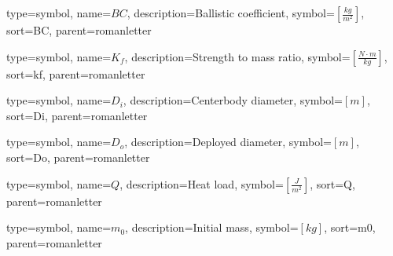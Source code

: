 {
type=symbol, %
name={\ensuremath{BC}}, %
description={Ballistic coefficient}, %
symbol={$\left[\frac{kg}{m^2} \right]$}, %
sort=BC, %
parent=romanletter %
}

{
type=symbol, %
name={\ensuremath{K_f}}, %
description={Strength to mass ratio}, %
symbol={$\left[\frac{N \cdot m}{kg} \right]$}, %
sort=kf, %
parent=romanletter %
}

{
type=symbol, %
name={\ensuremath{D_i}}, %
description={Centerbody diameter}, %
symbol={$\left[m \right]$}, %
sort=Di, %
parent=romanletter %
}

{
type=symbol, %
name={\ensuremath{D_o}}, %
description={Deployed diameter}, %
symbol={$\left[m \right]$}, %
sort=Do, %
parent=romanletter %
}

{
type=symbol, %
name={\ensuremath{Q}}, %
description={Heat load}, %
symbol={$\left[\frac{J}{m^2} \right]$}, %
sort=Q, %
parent=romanletter %
}

{
type=symbol, %
name={\ensuremath{m_0}}, %
description={Initial mass}, %
symbol={$\left[kg \right]$}, %
sort=m0, %
parent=romanletter %
}


